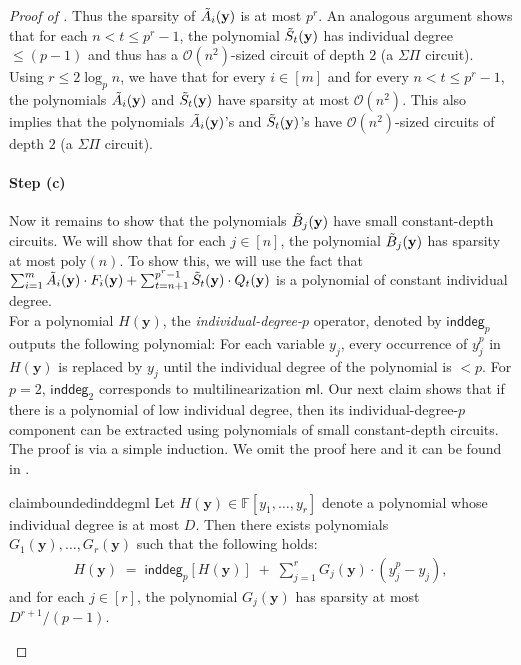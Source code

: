 \documentclass[11pt]{article}
\newcommand{\bigO}{\mathcal{O}}
\newcommand{\F}{\mathbb{F}}
\newcommand{\ml}{\mathsf{ml}}
\begin{document}
\begin{proof}[Proof of ]
Thus the sparsity of $\Tilde{A}_{i}(\mathbf{y})$ is at most $p^{r}$.
An analogous argument shows that for each $n < t \leq p^{r}-1$, the polynomial $\Tilde{S}_{t}(\mathbf{y})$ has individual degree $\leq (p-1)$ and thus has a $\bigO(n^{2})$-sized circuit of depth $2$ (a $\Sigma \Pi$ circuit).\\

\noindent
Using $r \leq 2 \log_{p} n$, we have that for every $i \in [m]$ and for every $n < t \leq p^{r}-1$, the polynomials $\Tilde{A}_{i}(\mathbf{y})$ and $\Tilde{S}_{t}(\mathbf{y})$ have sparsity at most $\bigO(n^{2})$. This also implies that the polynomials $\Tilde{A}_{i}(\mathbf{y})$'s and $\Tilde{S}_{t}(\mathbf{y})$'s have $\bigO(n^{2})$-sized circuits of depth $2$ (a $\Sigma \Pi$ circuit).

\paragraph{Step (c)}Now it remains to show that the polynomials $\Tilde{B}_{j}(\mathbf{y})$ have small constant-depth circuits. We will show that for each $j \in [n]$, the polynomial $\Tilde{B}_{j}(\mathbf{y})$ has sparsity at most $\mathrm{poly}(n)$. To show this, we will use the fact that $\sum_{i = 1}^{m} \Tilde{A}_{i}(\mathbf{y}) \cdot F_{i}(\mathbf{y}) + \sum_{t=n+1}^{p^{r}-1} \Tilde{S}_{t}(\mathbf{y}) \cdot Q_{t}(\mathbf{y})$ is a polynomial of constant individual degree.\\

\noindent
For a polynomial $H(\mathbf{y})$, the \emph{individual-degree-$p$} operator, denoted by $\mathsf{inddeg}_{p}$ outputs the following polynomial: For each variable $y_{j}$, every occurrence of $y_{j}^{p}$ in $H(\mathbf{y})$ is replaced by $y_{j}$ until the individual degree of the polynomial is $< p$. For $p = 2$, $\mathsf{inddeg}_{2}$ corresponds to multilinearization $\ml$.\newline
Our next claim shows that if there is a polynomial of low individual degree, then its individual-degree-$p$ component can be extracted using polynomials of small constant-depth circuits. The proof is via a simple induction. We omit the proof here and it can be found in .


\begin{restatable}{claim}{boundedinddegml}\label{claim:inddeg-p}
Let $H(\mathbf{y}) \in \F[y_{1},\ldots,y_{r}]$ denote a polynomial whose individual degree is at most $D$. Then there exists polynomials $G_{1}(\mathbf{y}), \ldots, G_{r}(\mathbf{y})$ such that the following holds:
\begin{align*}
    H(\mathbf{y}) \; = \; \mathsf{inddeg}_{p}[H(\mathbf{y})] \; + \; \sum_{j=1}^{r} G_{j}(\mathbf{y}) \cdot (y_{j}^{p} - y_{j}),
\end{align*}
and for each $j \in [r]$, the polynomial $G_{j}(\mathbf{y})$ has sparsity at most $D^{r+1}/(p-1)$.
\end{restatable}



\end{proof}
\end{document}
